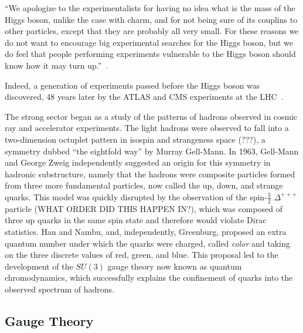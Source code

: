 ``We apologize to the experimentalists for having no idea what is the mass of the Higgs boson, unlike the case with charm, and for not being sure of its couplins to other particles, except that they are probably all very small. For these reasons we do not want to encourage big experimental searches for the Higgs boson, but we do feel that people performing experiments vulnerable to the Higgs boson should know how it may turn up.''~\cite{gaillardnanoellis1975}. 

Indeed, a generation of experiments passed before the Higgs boson was discovered, 48 years later by the ATLAS and CMS experiments at the LHC~\cite{atlashiggs, cmshiggs}. 

The strong sector began as a study of the patterns of hadrons observed in cosmic ray and accelerator experiments. The light hadrons were observed to fall into a two-dimension octuplet pattern in isospin and strangeness space (???), a symmetry dubbed ``the eightfold way'' by Murray Gell-Mann. In 1963, Gell-Mann and George Zweig independently suggested an origin for this symmetry in hadronic substructure, namely that the hadrons were composite particles formed from three more fundamental particles, now called the up, down, and strange quarks. This model was quickly disrupted by the observation of the spin-$\frac32$ $\Delta^{+++}$ particle (WHAT ORDER DID THIS HAPPEN IN?), which was composed of three up quarks in the same spin state and therefore would violate Dirac statistics. Han and Nambu, and, independently, Greenburg, proposed an extra quantum number under which the quarks were charged, called \emph{color} and taking on the three discrete values of red, green, and blue. This proposal led to the development of the $SU(3)$ gauge theory now known as quantum chromodynamics, which successfully explains the confinement of quarks into the observed spectrum of hadrons. 


\subsection{Gauge Theory}


